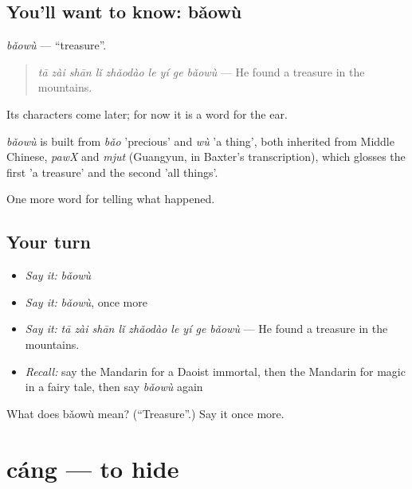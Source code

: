 \subsection*{You'll want to know: bǎowù}
\emph{bǎowù} — \textquotedblleft{}treasure\textquotedblright{}.

\begin{quote}
\emph{tā zài shān lǐ zhǎodào le yí ge bǎowù} — He found a treasure in the mountains.
\end{quote}

Its characters come later; for now it is a word for the ear.

\begin{cousinweb}
\emph{bǎowù} is built from \emph{bǎo} 'precious' and \emph{wù} 'a thing', both inherited from Middle Chinese, \emph{pawX} and \emph{mjut} (Guangyun, in Baxter's transcription), which glosses the first 'a treasure' and the second 'all things'.
\end{cousinweb}

\begin{grammarlens}[title={What you've built}]
One more word for telling what happened.
\end{grammarlens}

\subsection*{Your turn}
\begin{itemize}
\raggedright
  \item \emph{Say it:} \emph{bǎowù}
  \item \emph{Say it:} \emph{bǎowù}, once more
  \item \emph{Say it:} \emph{tā zài shān lǐ zhǎodào le yí ge bǎowù} — He found a treasure in the mountains.
  \item \emph{Recall:} say the Mandarin for a Daoist immortal, then the Mandarin for magic in a fairy tale, then say \emph{bǎowù} again
\end{itemize}

\begin{tcolorbox}[breakable,colback=teal!4,colframe=teal!35!black,title={Before you move on}]
What does bǎowù mean? (\textquotedblleft{}Treasure\textquotedblright{}.) Say it once more.
\end{tcolorbox}
\section[cáng]{cáng — to hide}


